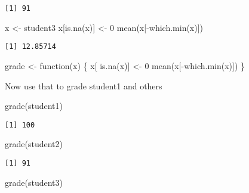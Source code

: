 \documentclass[
  letterpaper,
  DIV=11,
  numbers=noendperiod]{scrartcl}
\newenvironment{Shaded}{\begin{snugshade}}{\end{snugshade}}
\newcommand{\ControlFlowTok}[1]{\textcolor[rgb]{0.00,0.23,0.31}{#1}}
\newcommand{\DecValTok}[1]{\textcolor[rgb]{0.68,0.00,0.00}{#1}}
\newcommand{\FunctionTok}[1]{\textcolor[rgb]{0.28,0.35,0.67}{#1}}
\newcommand{\NormalTok}[1]{\textcolor[rgb]{0.00,0.23,0.31}{#1}}
\newcommand{\OtherTok}[1]{\textcolor[rgb]{0.00,0.23,0.31}{#1}}
\newcommand{\SpecialCharTok}[1]{\textcolor[rgb]{0.37,0.37,0.37}{#1}}
\begin{document}
\begin{verbatim}
[1] 91
\end{verbatim}

\begin{Shaded}
\begin{Highlighting}[]
\NormalTok{x }\OtherTok{\textless{}{-}}\NormalTok{ student3}
\NormalTok{x[}\FunctionTok{is.na}\NormalTok{(x)] }\OtherTok{\textless{}{-}} \DecValTok{0}
\FunctionTok{mean}\NormalTok{(x[}\SpecialCharTok{{-}}\FunctionTok{which.min}\NormalTok{(x)])}
\end{Highlighting}
\end{Shaded}

\begin{verbatim}
[1] 12.85714
\end{verbatim}

\begin{Shaded}
\begin{Highlighting}[]
\NormalTok{grade }\OtherTok{\textless{}{-}} \ControlFlowTok{function}\NormalTok{(x) \{}
\NormalTok{  x[ }\FunctionTok{is.na}\NormalTok{(x)] }\OtherTok{\textless{}{-}} \DecValTok{0}
  \FunctionTok{mean}\NormalTok{(x[}\SpecialCharTok{{-}}\FunctionTok{which.min}\NormalTok{(x)])}
\NormalTok{\}}
\end{Highlighting}
\end{Shaded}

Now use that to grade student1 and others

\begin{Shaded}
\begin{Highlighting}[]
\FunctionTok{grade}\NormalTok{(student1)}
\end{Highlighting}
\end{Shaded}

\begin{verbatim}
[1] 100
\end{verbatim}

\begin{Shaded}
\begin{Highlighting}[]
\FunctionTok{grade}\NormalTok{(student2)}
\end{Highlighting}
\end{Shaded}

\begin{verbatim}
[1] 91
\end{verbatim}

\begin{Shaded}
\begin{Highlighting}[]
\FunctionTok{grade}\NormalTok{(student3)}
\end{Highlighting}
\end{Shaded}
\end{document}

